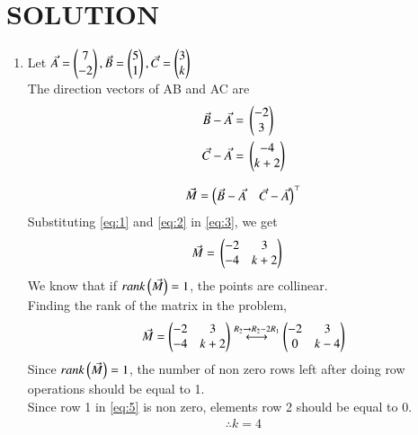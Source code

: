 \documentclass[journal,12pt,twocolumn]{IEEEtran}
\begin{document}
\section*{SOLUTION}
\begin{enumerate}
\item Let $\Vec{A}=\begin{pmatrix}7\\-2\end{pmatrix}, \Vec{B}=\begin{pmatrix}5 \\ 1\end{pmatrix}, \Vec{C}=\begin{pmatrix}3 \\ k\end{pmatrix}$\\
The direction vectors of AB and AC are
\begin{align}
\label{eq:1}
\Vec{B} - \Vec{A} ={}& \begin{pmatrix}-2 \\ 3\end{pmatrix}\\
\label{eq:2}
\Vec{C} - \Vec{A} ={}& \begin{pmatrix}-4 \\ k+2\end{pmatrix}
\end{align}

\begin{align}
\label{eq:3}
\Vec{M} =\begin{pmatrix}\Vec{B}-\Vec{A} & \Vec{C}-\Vec{A}\end{pmatrix}^\top
\end{align}
Substituting \eqref{eq:1} and \eqref{eq:2} in \eqref{eq:3}, we get
\begin{align}
\label{eq:4}
\Vec{M}={}&\begin{pmatrix}-2 & 3 \\ -4 & k+2\end{pmatrix}
\end{align}
We know that if $rank\left(\Vec{M}\right)=1$, the points are collinear.\\
Finding the rank of the matrix in the problem,
\begin{align}
\label{eq:5}
\Vec{M} = \begin{pmatrix}-2 & 3 \\ -4 & k+2\end{pmatrix} \overset{R_{2}\rightarrow R_{2}-2R_{1}}{\longleftrightarrow} \begin{pmatrix}-2 & 3 \\ 0 & k-4\end{pmatrix}
\end{align}
Since $rank\left(\Vec{M}\right)=1$, the number of non zero rows left after doing row operations should be equal to 1.\\
Since row 1 in \eqref{eq:5} is non zero, elements row 2 should be equal to 0.
\begin{align}
\therefore k=4
\end{align}


\end{enumerate}
\end{document}
